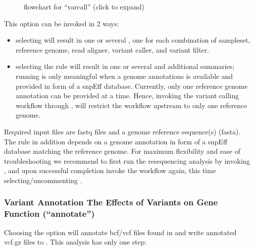 \documentclass[letterpaper,10pt,english]{sphinxhowto}
\let\sphinxpxdimen\pdfpxdimen\else\newdimen\sphinxpxdimen
\begin{document}
\begin{figure}[htbp]
\centering
\capstart

\noindent\sphinxincludegraphics[height=600\sphinxpxdimen]{{dna-proto-workflow-varcall-11}.png}
\caption{ flowchart for “varcall” (click to expand)}\label{\detokenize{index:id10}}\end{figure}

This option can be invoked in 2 ways:
\begin{itemize}
\item {} 
selecting  will result in one or several , one for each combination of sample\sphinxhyphen{}set, reference genome, read aligner, variant caller, and variant filter.

\item {} 
selecting the rule  will result in one or several  and additional summaries; running   is only meaningful when a genome annotations is available and provided in form of a snpEff database. Currently, only one reference genome annotation can be provided at a time. Hence, invoking the variant calling workflow through , will restrict the  workflow upstream to only one reference genome.

\end{itemize}

Required input files are fastq files and a genome reference sequence(s) (fasta). The rule  in addition depends on a genome annotation in form of a snpEff database matching the reference genome. For maximum flexibility and ease of troubleshooting we recommend to first run the re\sphinxhyphen{}sequencing analysis by invoking , and upon successful completion invoke the workflow again, this time selecting/uncommenting .


\subsubsection{Variant Annotation \sphinxhyphen{} The Effects of Variants on Gene Function (“annotate”)}
\label{\detokenize{index:variant-annotation-the-effects-of-variants-on-gene-function-annotate}}
Choosing the option  will annotate bcf/vcf files found in  and write annotated vcf.gz files to . This analysis has only one step:
\end{document}
